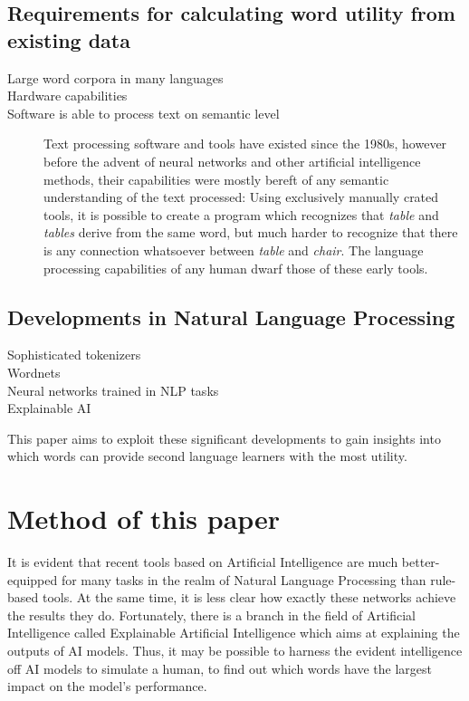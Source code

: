 \subsection{Requirements for calculating word utility from existing data}

\begin{description}
	\item [Large word corpora in many languages]
	\item [Hardware capabilities]
	\item [Software is able to process text on semantic level]
	      Text processing software and tools have existed since the 1980s, however before the advent of neural networks and other artificial intelligence methods, their capabilities were mostly bereft of any semantic understanding of the text processed: Using exclusively manually crated tools, it is possible to create a program which recognizes that \textit{table} and \textit{tables} derive from the same word, but much harder to recognize that there is any connection whatsoever between \textit{table} and \textit{chair}. The language processing capabilities of any human dwarf those of these early tools.
\end{description}

\subsection{Developments in Natural Language Processing}
\begin{description}
	\item [Sophisticated tokenizers]
	\item [Wordnets]
	\item [Neural networks trained in NLP tasks]
	\item [Explainable AI]
\end{description}

This paper aims to exploit these significant developments to gain insights into which words can provide second language learners with the most utility.

\section{Method of this paper}
It is evident that recent tools based on Artificial Intelligence are much better-equipped for many tasks in the realm of Natural Language Processing than rule-based tools.
At the same time, it is less clear how exactly these networks achieve the results they do.
Fortunately, there is a branch in the field of Artificial Intelligence called Explainable Artificial Intelligence which aims at explaining the outputs of AI models.
Thus, it may be possible to harness the evident intelligence off AI models to simulate a human, to find out which words have the largest impact on the model's performance.

